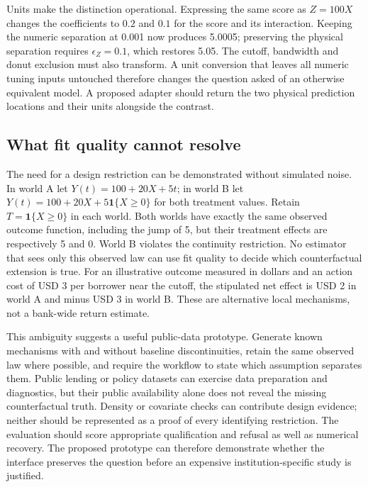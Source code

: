 Units make the distinction operational. Expressing the same score as $Z=100X$
changes the coefficients to $0.2$ and $0.1$ for the score and its interaction.
Keeping the numeric separation at 0.001 now produces 5.0005; preserving the
physical separation requires $\epsilon_Z=0.1$, which restores 5.05. The cutoff,
bandwidth and donut exclusion must also transform. A unit conversion that leaves
all numeric tuning inputs untouched therefore changes the question asked of an
otherwise equivalent model. A proposed adapter should return the two physical
prediction locations and their units alongside the contrast.
\citep{exec14_causalpy_exact,exec14_causalpy_decision}

\subsection{What fit quality cannot resolve}

The need for a design restriction can be demonstrated without simulated noise.
In world A let $Y(t)=100+20X+5t$; in world B let
$Y(t)=100+20X+5\mathbf{1}\{X\geq0\}$ for both treatment values. Retain
$T=\mathbf{1}\{X\geq0\}$ in each world. Both worlds have exactly the same
observed outcome function, including the jump of 5, but their treatment effects
are respectively 5 and 0. World B violates the continuity restriction. No
estimator that sees only this observed law can use fit quality to decide which
counterfactual extension is true. For an illustrative outcome measured in dollars
and an action cost of USD 3 per borrower near the cutoff, the stipulated net
effect is USD 2 in world A and minus USD 3 in world B. These are alternative
local mechanisms, not a bank-wide return estimate.~\citep{exec14_causalpy_exact}

This ambiguity suggests a useful public-data prototype. Generate known mechanisms
with and without baseline discontinuities, retain the same observed law where
possible, and require the workflow to state which assumption separates them.
Public lending or policy datasets can exercise data preparation and diagnostics,
but their public availability alone does not reveal the missing counterfactual
truth. Density or covariate checks can contribute design evidence; neither should
be represented as a proof of every identifying restriction. The evaluation should
score appropriate qualification and refusal as well as numerical recovery.
The proposed prototype can therefore demonstrate whether the interface preserves
the question before an expensive institution-specific study is justified.
\citep{exec14_causalpy_decision}

